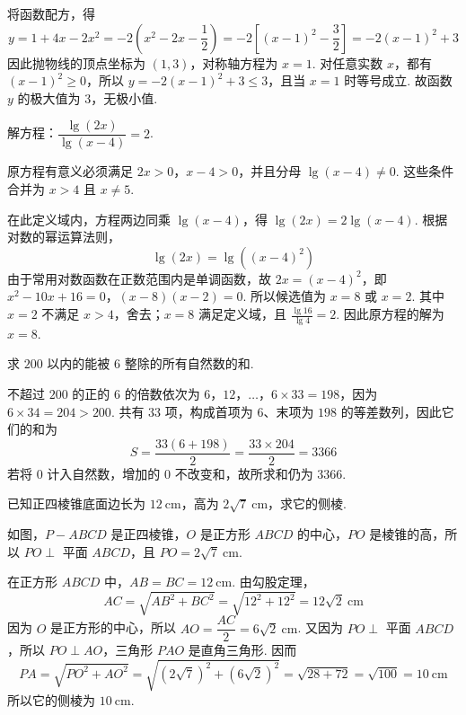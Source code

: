\begin{solution}
将函数配方，得
\[
y=1+4x-2x^2=-2\left(x^2-2x-\dfrac12\right)=-2\left[(x-1)^2-\dfrac32\right]=-2(x-1)^2+3
\]
因此抛物线的顶点坐标为 \((1,3)\)，对称轴方程为 \(x=1\). 对任意实数 \(x\)，都有 \((x-1)^2\geqslant0\)，所以 \(y=-2(x-1)^2+3\leqslant3\)，且当 \(x=1\) 时等号成立. 故函数 \(y\) 的极大值为 \(3\)，无极小值.
\end{solution}

\begin{problem}
解方程：\(\dfrac{\lg(2x)}{\lg(x-4)}=2\).
\end{problem}

\begin{solution}
原方程有意义必须满足 \(2x>0\)，\(x-4>0\)，并且分母 \(\lg(x-4)\neq0\). 这些条件合并为 \(x>4\) 且 \(x\neq5\).

在此定义域内，方程两边同乘 \(\lg(x-4)\)，得 \(\lg(2x)=2\lg(x-4)\). 根据对数的幂运算法则，
\[
\lg(2x)=\lg\left((x-4)^2\right)
\]
由于常用对数函数在正数范围内是单调函数，故 \(2x=(x-4)^2\)，即
\(x^2-10x+16=0\)，\((x-8)(x-2)=0\).
所以候选值为 \(x=8\) 或 \(x=2\). 其中 \(x=2\) 不满足 \(x>4\)，舍去；\(x=8\) 满足定义域，且 \(\frac{\lg16}{\lg4}=2\). 因此原方程的解为 \(x=8\).
\end{solution}

\begin{problem}
求 \(200\) 以内的能被 \(6\) 整除的所有自然数的和.
\end{problem}

\begin{solution}
不超过 \(200\) 的正的 \(6\) 的倍数依次为 \(6\)，\(12\)，\(\ldots\)，\(6\times33=198\)，因为 \(6\times34=204>200\). 共有 \(33\) 项，构成首项为 \(6\)、末项为 \(198\) 的等差数列，因此它们的和为
\[
S=\dfrac{33(6+198)}{2}=\dfrac{33\times204}{2}=3366
\]
若将 \(0\) 计入自然数，增加的 \(0\) 不改变和，故所求和仍为 \(3366\).
\end{solution}

\begin{problem}
已知正四棱锥底面边长为 \(12\mathrm{~cm}\)，高为 \(2\sqrt7\mathrm{~cm}\)，求它的侧棱.
\end{problem}

\begin{solution}
如图，\(P-ABCD\) 是正四棱锥，\(O\) 是正方形 \(ABCD\) 的中心，\(PO\) 是棱锥的高，所以 \(PO\perp\) 平面 \(ABCD\)，且 \(PO=2\sqrt7\mathrm{~cm}\).


在正方形 \(ABCD\) 中，\(AB=BC=12\mathrm{~cm}\). 由勾股定理，
\[
AC=\sqrt{AB^2+BC^2}=\sqrt{12^2+12^2}=12\sqrt2\mathrm{~cm}
\]
因为 \(O\) 是正方形的中心，所以 \(AO=\dfrac{AC}{2}=6\sqrt2\mathrm{~cm}\). 又因为 \(PO\perp\) 平面 \(ABCD\)，所以 \(PO\perp AO\)，三角形 \(PAO\) 是直角三角形. 因而
\[
PA=\sqrt{PO^2+AO^2}=\sqrt{(2\sqrt7)^2+(6\sqrt2)^2}=\sqrt{28+72}=\sqrt{100}=10\mathrm{~cm}
\]
所以它的侧棱为 \(10\mathrm{~cm}\).
\end{solution}


